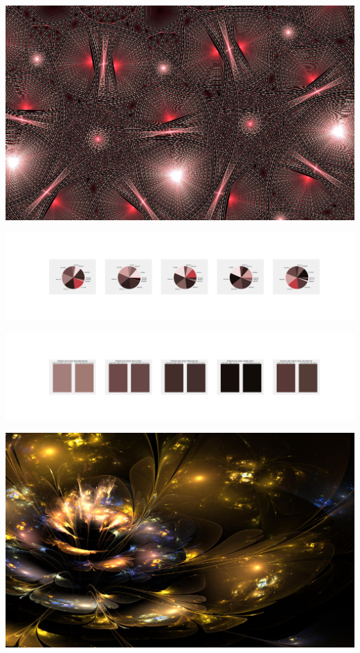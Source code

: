 \documentclass[11pt]{article}
\begin{document}
\begin{landscape}
    \begin{center}
    \includegraphics[width=\textwidth]{./nbimg/file (54).jpg}
    \end{center}

    \begin{center}
    \includegraphics[width=250mm]{./nbimg/pie-401.jpg}
    \end{center}

    \begin{center}
    \includegraphics[width=250mm]{./nbimg/peak-401.jpg}
    \end{center}
    

    \begin{center}
    \includegraphics[width=\textwidth]{./nbimg/file (55).jpg}
    \end{center}


\end{landscape}
\end{document}
